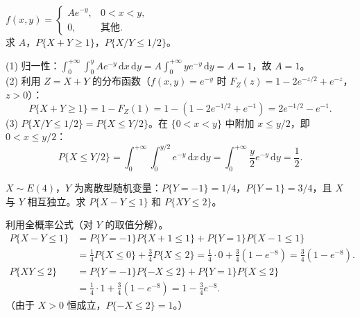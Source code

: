 \documentclass[lang=cn,11pt]{elegantbook}
\begin{document}
\begin{exercise}[概率计算] \label{exer:3-c12}
$f(x,y) = \begin{cases} Ae^{-y}, & 0 < x < y, \\ 0, & \text{其他}. \end{cases}$\\
求 $A$，$P\{X+Y \geqslant 1\}$，$P\{X/Y \leqslant 1/2\}$。
\end{exercise}
\begin{solution}
(1) 归一性：$\displaystyle\int_0^{+\infty}\int_0^y Ae^{-y}\,\mathrm{d}x\,\mathrm{d}y = A\int_0^{+\infty}ye^{-y}\,\mathrm{d}y = A = 1$，故 $A = 1$。\\
(2) 利用 $Z = X+Y$ 的分布函数（$f(x,y) = e^{-y}$ 时 $F_Z(z) = 1 - 2e^{-z/2} + e^{-z}$，$z > 0$）：
\[
P\{X+Y \geqslant 1\} = 1 - F_Z(1) = 1 - (1 - 2e^{-1/2} + e^{-1}) = 2e^{-1/2} - e^{-1}.
\]
(3) $P\{X/Y \leqslant 1/2\} = P\{X \leqslant Y/2\}$。在 $\{0 < x < y\}$ 中附加 $x \leqslant y/2$，即 $0 < x \leqslant y/2$：
\[
P\{X \leqslant Y/2\} = \int_0^{+\infty}\int_0^{y/2}e^{-y}\,\mathrm{d}x\,\mathrm{d}y = \int_0^{+\infty}\frac{y}{2}e^{-y}\,\mathrm{d}y = \frac{1}{2}.
\]
\end{solution}

\begin{exercise}[混合型：连续+离散] \label{exer:3-c13}
$X \sim E(4)$，$Y$ 为离散型随机变量：$P\{Y=-1\} = 1/4$，$P\{Y=1\} = 3/4$，且 $X$ 与 $Y$ 相互独立。求 $P\{X-Y \leqslant 1\}$ 和 $P\{XY \leqslant 2\}$。
\end{exercise}
\begin{solution}
利用全概率公式（对 $Y$ 的取值分解）。
\begin{align*}
P\{X-Y \leqslant 1\} &= P\{Y=-1\}P\{X+1 \leqslant 1\} + P\{Y=1\}P\{X-1 \leqslant 1\}\\
&= \frac{1}{4}P\{X \leqslant 0\} + \frac{3}{4}P\{X \leqslant 2\} = \frac{1}{4}\cdot 0 + \frac{3}{4}(1-e^{-8}) = \frac{3}{4}(1-e^{-8}).\\
P\{XY \leqslant 2\} &= P\{Y=-1\}P\{-X \leqslant 2\} + P\{Y=1\}P\{X \leqslant 2\}\\
&= \frac{1}{4}\cdot 1 + \frac{3}{4}(1-e^{-8}) = 1 - \frac{3}{4}e^{-8}.
\end{align*}
（由于 $X > 0$ 恒成立，$P\{-X \leqslant 2\} = 1$。）
\end{solution}
\end{document}
